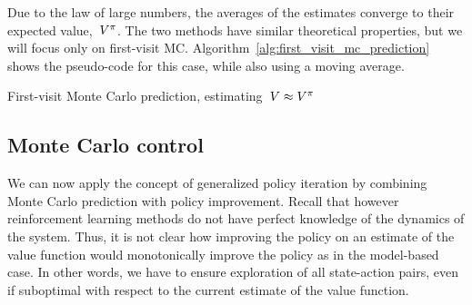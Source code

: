 Due to the law of large numbers, the averages of the estimates converge to their expected value,~$V^{\pi}$. The two methods have similar theoretical properties, but we will focus only on first-visit MC. Algorithm~\ref{alg:first_visit_mc_prediction} shows the pseudo-code for this case, while also using a moving average.
\begin{algorithm}
	\caption{First-visit Monte Carlo prediction, estimating~${\estimatestatevalue\approx\statevalue\policyscript}$}
	\label{alg:first_visit_mc_prediction}

\end{algorithm}

\subsection{Monte Carlo control}
We can now apply the concept of generalized policy iteration by combining Monte Carlo prediction with policy improvement. Recall that however reinforcement learning methods do not have perfect knowledge of the dynamics of the system. Thus, it is not clear how improving the policy on an estimate of the value function would monotonically improve the policy as in the model-based case. In other words, we have to ensure exploration of all state-action pairs, even if suboptimal with respect to the current estimate of the value function.

